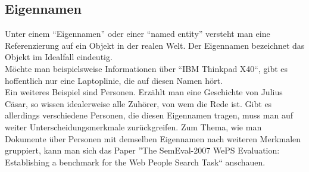 \subsection{Eigennamen}
Unter einem ``Eigennamen'' oder einer ``named entity'' versteht man eine Referenzierung auf ein Objekt in der realen Welt. Der Eigennamen bezeichnet das Objekt im Idealfall eindeutig.\\
Möchte man beispielsweise Informationen über ``IBM Thinkpad X40``, gibt es hoffentlich nur eine Laptoplinie, die auf diesen Namen hört.\\
Ein weiteres Beispiel sind Personen. Erzählt man eine Geschichte von Julius Cäsar, so wissen idealerweise alle Zuhörer, von wem die Rede ist. Gibt es allerdings verschiedene Personen, die diesen Eigennamen tragen, muss man auf weiter Unterscheidungsmerkmale zurückgreifen. Zum Thema, wie man Dokumente über Personen mit demselben Eigennamen nach weiteren Merkmalen gruppiert, kann man sich das Paper ''The SemEval-2007 WePS Evaluation: Establishing a benchmark for the Web People Search Task``\cite{paper:Artiles} anschauen.
